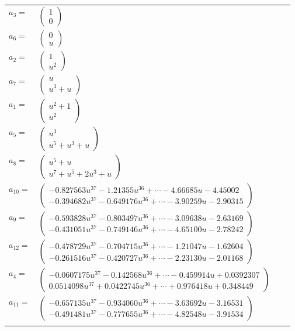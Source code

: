 \documentclass[1p]{elsarticle_modified}
\theoremstyle{definition}
\begin{document}
\begin{tabular}{m{7pt} m{180pt} m{7pt} m{180pt} }
\flushright $a_{3}=$&$\begin{pmatrix}1\\0\end{pmatrix}$ \\
\flushright $a_{6}=$&$\begin{pmatrix}0\\u\end{pmatrix}$ \\
\flushright $a_{2}=$&$\begin{pmatrix}1\\u^2\end{pmatrix}$ \\
\flushright $a_{7}=$&$\begin{pmatrix}u\\u^3+u\end{pmatrix}$ \\
\flushright $a_{1}=$&$\begin{pmatrix}u^2+1\\u^2\end{pmatrix}$ \\
\flushright $a_{5}=$&$\begin{pmatrix}u^3\\u^5+u^3+u\end{pmatrix}$ \\
\flushright $a_{8}=$&$\begin{pmatrix}u^5+u\\u^7+u^5+2 u^3+u\end{pmatrix}$ \\
\flushright $a_{10}=$&$\begin{pmatrix}-0.827563 u^{37}-1.21355 u^{36}+\cdots-4.66685 u-4.45002\\-0.394682 u^{37}-0.649176 u^{36}+\cdots-3.90259 u-2.90315\end{pmatrix}$ \\
\flushright $a_{9}=$&$\begin{pmatrix}-0.593828 u^{37}-0.803497 u^{36}+\cdots-3.09638 u-2.63169\\-0.431051 u^{37}-0.749146 u^{36}+\cdots-4.65100 u-2.78242\end{pmatrix}$ \\
\flushright $a_{12}=$&$\begin{pmatrix}-0.478729 u^{37}-0.704715 u^{36}+\cdots-1.21047 u-1.62604\\-0.261516 u^{37}-0.420727 u^{36}+\cdots-2.23130 u-2.01168\end{pmatrix}$ \\
\flushright $a_{4}=$&$\begin{pmatrix}-0.0607175 u^{37}-0.142568 u^{36}+\cdots-0.459914 u+0.0392307\\0.0514098 u^{37}+0.0422745 u^{36}+\cdots+0.976418 u+0.348449\end{pmatrix}$ \\
\flushright $a_{11}=$&$\begin{pmatrix}-0.657135 u^{37}-0.934060 u^{36}+\cdots-3.63692 u-3.16531\\-0.491481 u^{37}-0.777655 u^{36}+\cdots-4.82548 u-3.91534\end{pmatrix}$\\&\end{tabular}
\end{document}
